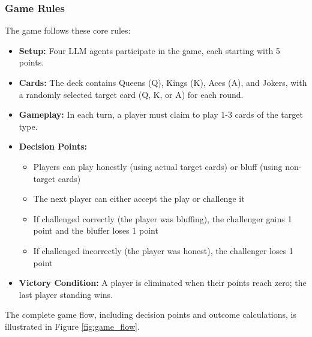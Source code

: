 \documentclass{article}
\begin{document}
\subsubsection{Game Rules}
The game follows these core rules:
\begin{itemize}
    \item \textbf{Setup:} Four LLM agents participate in the game, each starting with 5 points.
    \item \textbf{Cards:} The deck contains Queens (Q), Kings (K), Aces (A), and Jokers, with a randomly selected target card (Q, K, or A) for each round.
    \item \textbf{Gameplay:} In each turn, a player must claim to play 1-3 cards of the target type.
    \item \textbf{Decision Points:}
        \begin{itemize}
            \item Players can play honestly (using actual target cards) or bluff (using non-target cards)
            \item The next player can either accept the play or challenge it
            \item If challenged correctly (the player was bluffing), the challenger gains 1 point and the bluffer loses 1 point
            \item If challenged incorrectly (the player was honest), the challenger loses 1 point
        \end{itemize}
    \item \textbf{Victory Condition:} A player is eliminated when their points reach zero; the last player standing wins.
\end{itemize}

The complete game flow, including decision points and outcome calculations, is illustrated in Figure \ref{fig:game_flow}.
\end{document}
